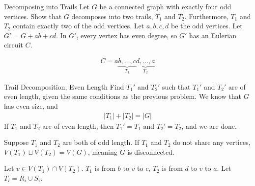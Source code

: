 \documentclass[10pt]{extarticle}
\begin{document}
  \begin{problem}{Decomposing into Trails}
    Let $G$ be a connected graph with exactly four odd vertices. Show that $G$ decomposes into two trails, $T_1$ and $T_2$. Furthermore, $T_1$ and $T_2$ contain exactly two of the odd vertices.
    \tcblower
    Let $a,b,c,d$ be the odd vertices. Let $G' = G + ab + cd$. In $G'$, every vertex has even degree, so $G'$ has an Eulerian circuit $C$.\newline

    \begin{align*}
      C = a\underbrace{b,\dots,c}_{T_1}\underbrace{d,\dots,a}_{T_2}
    \end{align*}
  \end{problem}
  \begin{problem}{Trail Decomposition, Even Length}
    Find $T_1'$ and $T_2'$ such that $T_1'$ and $T_2'$ are of even length, given the same conditions as the previous problem.
    \tcblower
    We know that $G$ has even size, and
    \begin{align*}
      |T_1| + |T_2| = |G|
    \end{align*}
    If $T_1$ and $T_2$ are of even length, then $T_1' = T_1$ and $T_2' = T_2$, and we are done.\newline

    Suppose $T_1$ and $T_2$ are both of odd length. If $T_1$ and $T_2$ do not share any vertices, $V(T_1) \sqcup V(T_2) = V(G)$, meaning $G$ is disconnected.\newline

    Let $v \in V(T_1) \cap V(T_2)$. $T_1$ is from $b$ to $v$ to $c$, $T_2$ is from $d$ to $v$ to $a$. Let $T_i = R_i \cup S_i$. 
  \end{problem}
\end{document}
